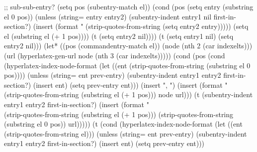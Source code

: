 \begin{ifhtml}
{                 ;; sub-sub-entry?
                 (setq pos (subentry-match el))
                 (cond (pos
                        (setq entry (substring el 0 pos))
                        (unless (string= entry entry2)
                          (subentry-indent entry1 nil first-in-section?)
                          (insert (format "%
                                          (strip-quotes-from-string
                                           (setq entry2 entry)))))
                        (setq el (substring el (+ 1 pos))))
                       (t (setq entry2 nil))))
                (t (setq entry1 nil)
                   (setq entry2 nil)))
          (let* ((pos (commandentry-match el))
                 (node (nth 2 (car indexelts)))
                 (url (hyperlatex-gen-url node
                                          (nth 3 (car indexelts)))))
            (cond (pos 
                   (cond (hyperlatex-index-node-format
                          (let ((ent 
                                 (strip-quotes-from-string  
                                  (substring el 0 pos))))
                            (unless (string= ent prev-entry)
                              (subentry-indent entry1 entry2 first-in-section?)
                              (insert ent)
                              (setq prev-entry ent)))
                          (insert ", ")
                          (insert (format "\\%
                                          (strip-quotes-from-string
                                           (substring el (+ 1 pos)))
                                            node
                                            url)))
                         (t (subentry-indent entry1 entry2 first-in-section?)
                            (insert (format "\\%
                                            (strip-quotes-from-string
                                             (substring el (+ 1 pos)))
                                            (strip-quotes-from-string 
                                             (substring el 0 pos))
                                            url)))))
                  (t (cond 
                      (hyperlatex-index-node-format
                       (let ((ent (strip-quotes-from-string el)))
                         (unless (string= ent prev-entry)
                           (subentry-indent entry1 entry2 first-in-section?)
                           (insert ent)
                           (setq prev-entry ent)))
}
\end{ifhtml}
